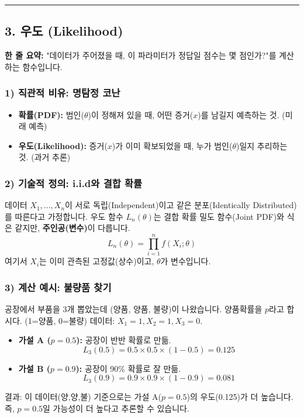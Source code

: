 \documentclass[11pt,a4paper]{book}
\theoremstyle{definition}
\begin{document}
\vspace{0.5cm}\hrule\vspace{0.5cm}

\subsection{3. 우도 (Likelihood)}

\begin{conceptbox}[title={개념 3: 관점의 대전환}]
\textbf{한 줄 요약:} "데이터가 주어졌을 때, 이 파라미터가 정답일 점수는 몇 점인가?"를 계산하는 함수입니다.
\end{conceptbox}

\subsubsection*{1) 직관적 비유: 명탐정 코난}
\begin{itemize}
    \item \textbf{확률(PDF):} 범인($\theta$)이 정해져 있을 때, 어떤 증거($x$)를 남길지 예측하는 것. (미래 예측)
    \item \textbf{우도(Likelihood):} 증거($x$)가 이미 확보되었을 때, 누가 범인($\theta$)일지 추리하는 것. (과거 추론)
\end{itemize}

\subsubsection*{2) 기술적 정의: i.i.d와 결합 확률}
데이터 $X_1, ..., X_n$이 서로 독립(Independent)이고 같은 분포(Identically Distributed)를 따른다고 가정합니다.
우도 함수 $L_n(\theta)$는 결합 확률 밀도 함수(Joint PDF)와 식은 같지만, \textbf{주인공(변수)}이 다릅니다.
$$ L_n(\theta) = \prod_{i=1}^n f(X_i; \theta) $$
여기서 $X_i$는 이미 관측된 고정값(상수)이고, $\theta$가 변수입니다.

\subsubsection*{3) 계산 예시: 불량품 찾기}
공장에서 부품을 3개 뽑았는데 (양품, 양품, 불량)이 나왔습니다. 양품확률을 $p$라고 합시다. (1=양품, 0=불량)
데이터: $X_1=1, X_2=1, X_3=0$.
\begin{itemize}
    \item \textbf{가설 A ($p=0.5$):} 공장이 반반 확률로 만듦.
    $$ L_3(0.5) = 0.5 \times 0.5 \times (1-0.5) = 0.125 $$
    \item \textbf{가설 B ($p=0.9$):} 공장이 90\% 확률로 잘 만듦.
    $$ L_3(0.9) = 0.9 \times 0.9 \times (1-0.9) = 0.081 $$
\end{itemize}
결과: 이 데이터(양,양,불) 기준으로는 가설 A($p=0.5$)의 우도(0.125)가 더 높습니다. 즉, $p=0.5$일 가능성이 더 높다고 추론할 수 있습니다.
\end{document}
